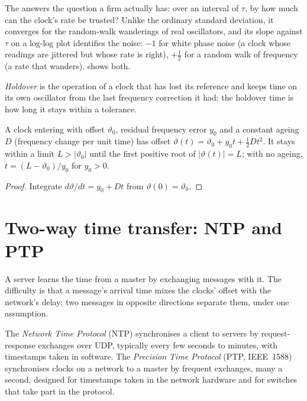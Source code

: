 The  answers the question a firm actually has: over an interval of $\tau$, by how much can the clock's rate be
trusted? Unlike the ordinary standard deviation, it converges for the random-walk wanderings of real oscillators, and its slope
against $\tau$ on a log-log plot identifies the noise: $-1$ for white phase noise (a clock whose readings are jittered but whose rate is
right), $+\tfrac12$ for a random walk of frequency (a rate that wanders).  shows both.

\begin{definition}[Holdover]\label{def:nw:time-synchronisation:holdover}
\emph{Holdover} is the operation of a clock that has lost its reference and keeps time on its own oscillator from
the last frequency correction it had; the holdover time is how long it stays within a tolerance.
\end{definition}

\begin{proposition}\label{prop:nw:time-synchronisation:holdover}
A clock entering  with offset $\vartheta_0$, residual frequency error $y_0$ and a constant ageing $D$ (frequency change per
unit time) has offset $\vartheta(t) = \vartheta_0 + y_0 t + \tfrac12 D t^2$. It stays within a limit $L > |\vartheta_0|$ until the
first positive root of $|\vartheta(t)| = L$; with no ageing, $t = (L - \vartheta_0)/y_0$ for $y_0 > 0$.
\end{proposition}

\begin{proof}
Integrate $d\vartheta/dt = y_0 + Dt$ from $\vartheta(0) = \vartheta_0$.
\end{proof}

\section{Two-way time transfer: NTP and PTP}

A server learns the time from a master by exchanging messages with it. The difficulty is that a message's arrival time mixes the
clocks' offset with the network's delay; two messages in opposite directions separate them, under one assumption.

\begin{definition}\label{def:nw:time-synchronisation:protocols}
The \emph{Network Time Protocol} (NTP) synchronises a client to servers by request-response exchanges
over UDP, typically every few seconds to minutes, with timestamps taken in software. The \emph{Precision Time
Protocol} (PTP, IEEE~1588) synchronises clocks on a network to a master by frequent exchanges, many a
second, designed for timestamps taken in the network hardware and for switches that take part in the protocol.
\end{definition}

